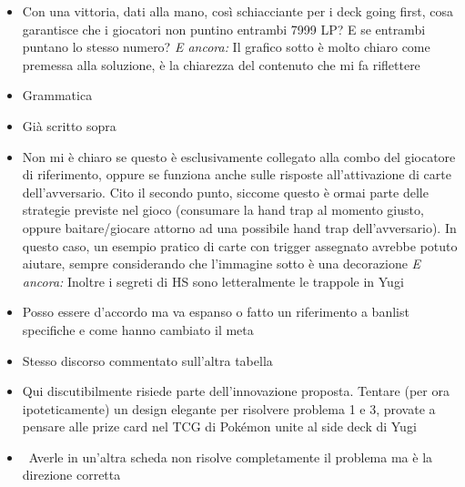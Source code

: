 {\begin{itemize}
  \item {} Con una vittoria, dati alla mano, così schiacciante per i deck going first, cosa garantisce che i giocatori non puntino entrambi 7999 LP? E se entrambi puntano lo stesso numero? \emph{E ancora:} Il grafico sotto è molto chiaro come premessa alla soluzione, è la chiarezza del contenuto che mi fa riflettere
  \item {} Grammatica
  \item {} Già scritto sopra
  \item {} Non mi è chiaro se questo è esclusivamente collegato alla combo del giocatore di riferimento, oppure se funziona anche sulle risposte all'attivazione di carte dell'avversario. Cito il secondo punto, siccome questo è ormai parte delle strategie previste nel gioco (consumare la hand trap al momento giusto, oppure baitare/giocare attorno ad una possibile hand trap dell'avversario). In questo caso, un esempio pratico di carte con trigger assegnato avrebbe potuto aiutare, sempre considerando che l'immagine sotto è una decorazione \emph{E ancora:} Inoltre i segreti di HS sono letteralmente le trappole in Yugi
  \item {} Posso essere d'accordo ma va espanso o fatto un riferimento a banlist specifiche e come hanno cambiato il meta
  \item {} Stesso discorso commentato sull'altra tabella
  \item {} Qui discutibilmente risiede parte dell'innovazione proposta. Tentare (per ora ipoteticamente) un design elegante per risolvere problema 1 e 3, provate a pensare alle prize card nel TCG di Pokémon unite al side deck di Yugi
  \item {} \rvBene\ Averle in un'altra scheda non risolve completamente il problema ma è la direzione corretta
\end{itemize}
}

